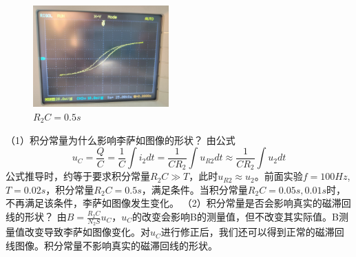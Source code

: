 \documentclass[11pt]{article}
\begin{document}
\begin{enumerate}
\begin{figure}[H]
\begin{minipage}[t]{0.33\linewidth}
            \caption{$R_2C=0.05s$}
        \end{minipage}
        \begin{minipage}[t]{0.33\linewidth}
            \centering
            \includegraphics[width=5.2cm]{Fig/5-0.5.jpg}
            \caption{$R_2C=0.5s$}
        \end{minipage}
        
    \end{figure}
    （1）积分常量为什么影响李萨如图像的形状？
    \newline 由公式
    \[u_C=\frac{Q}{C}=\frac{1}{C}\int i_2dt=\frac{1}{CR_2}\int u_{R2}dt\approx \frac{1}{CR_2}\int u_{2}dt\]
    \hspace*{2em}公式推导时，约等于要求积分常量$R_2C\gg T$，此时$u_{R2}\approx u_2$。前面实验$f=100Hz$,$T=0.02s$，积分常量$R_2C=0.5s$，满足条件。当积分常量$R_2C=0.05s,0.01s$时，不再满足该条件，李萨如图像发生变化。
    \newline （2）积分常量是否会影响真实的磁滞回线的形状？
    \newline \hspace*{2em}由$B=\frac{R_2C}{N_2S}u_C$，$u_C$的改变会影响B的测量值，但不改变其实际值。B测量值改变导致李萨如图像变化。对$u_C$进行修正后，我们还可以得到正常的磁滞回线图像。积分常量不影响真实的磁滞回线的形状。
\end{enumerate}
\end{document}
